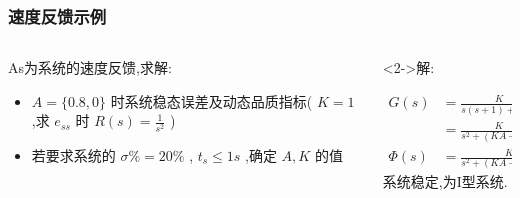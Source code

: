 \documentclass{beamer}
\begin{document}
\begin{frame}
\frametitle{速度反馈示例}
\label{sec-1-2}
\begin{columns}
\begin{column}{0.5\textwidth}
\label{sec-1-2-1}


As为系统的速度反馈,求解:
\begin{itemize}
\item $A=\{0.8,0\}$ 时系统稳态误差及动态品质指标( $K=1$ ,求 $e_{ss}$ 时 $R(s)=\frac{1}{s^2}$ )
\item 若要求系统的 $\sigma\%=20\%$ , $t_s\leq 1s$ ,确定 $A,K$ 的值
\end{itemize}
\end{column}
\begin{column}{0.5\textwidth}
\begin{block}<2->{解:}
\label{sec-1-2-2}


\begin{align*}
G(s)&= \frac{K}{s(s+1)+KAs}\\
    &=  \frac{K}{s^2+(KA+1)s} \\
\Phi(s) &= \frac{K}{s^2+(KA+1)s+K} 
\end{align*}
系统稳定,为I型系统.
\end{block}
\end{column}
\end{columns}
\end{frame}
\end{document}
